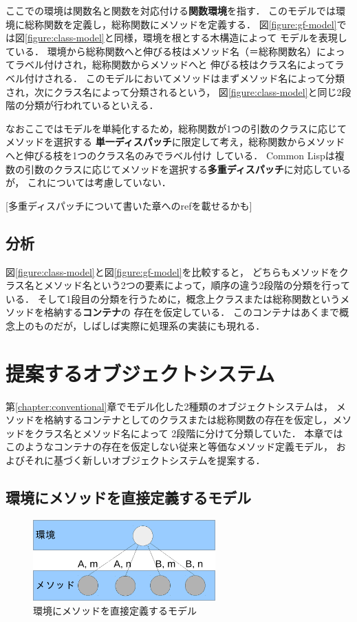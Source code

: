 \documentclass[a4paper,11pt,dvipdfmx]{jreport}
\begin{document}
ここでの環境は関数名と関数を対応付ける\textbf{関数環境}を指す．
このモデルでは環境に総称関数を定義し，総称関数にメソッドを定義する．
図\ref{figure:gf-model}では図\ref{figure:class-model}と同様，環境を根とする木構造によって
モデルを表現している．
環境から総称関数へと伸びる枝はメソッド名（＝総称関数名）によってラベル付けされ，総称関数からメソッドへと
伸びる枝はクラス名によってラベル付けされる．
このモデルにおいてメソッドはまずメソッド名によって分類され，次にクラス名によって分類されるという，
図\ref{figure:class-model}と同じ2段階の分類が行われているといえる．

なおここではモデルを単純化するため，総称関数が1つの引数のクラスに応じてメソッドを選択する
\textbf{単一ディスパッチ}に限定して考え，総称関数からメソッドへと伸びる枝を1つのクラス名のみでラベル付け
している．
Common Lispは複数の引数のクラスに応じてメソッドを選択する\textbf{多重ディスパッチ}に対応しているが，
これについては考慮していない．

[多重ディスパッチについて書いた章へのrefを載せるかも]

\section{分析}

図\ref{figure:class-model}と図\ref{figure:gf-model}を比較すると，
どちらもメソッドをクラス名とメソッド名という2つの要素によって，順序の違う2段階の分類を行っている．
そして1段目の分類を行うために，概念上クラスまたは総称関数というメソッドを格納する\textbf{コンテナ}の
存在を仮定している．
このコンテナはあくまで概念上のものだが，しばしば実際に処理系の実装にも現れる．


\chapter{提案するオブジェクトシステム}

第\ref{chapter:conventional}章でモデル化した2種類のオブジェクトシステムは，
メソッドを格納するコンテナとしてのクラスまたは総称関数の存在を仮定し，メソッドをクラス名とメソッド名によって
2段階に分けて分類していた．
本章ではこのようなコンテナの存在を仮定しない従来と等価なメソッド定義モデル，
およびそれに基づく新しいオブジェクトシステムを提案する．

\section{環境にメソッドを直接定義するモデル}

\begin{figure}[htbp]
	\centering
	\includegraphics[width=7cm]{fig/trees_containerless-crop.pdf}
	\caption{環境にメソッドを直接定義するモデル}
	\label{figure:containerlsss-model}
\end{figure}
\end{document}
